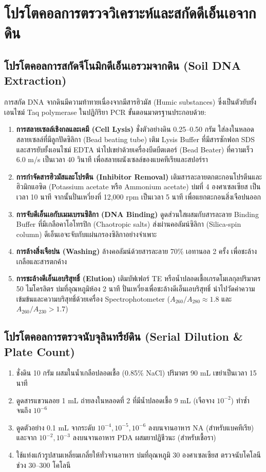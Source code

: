 \chapter{โปรโตคอลการตรวจวิเคราะห์และสกัดดีเอ็นเอจากดิน}
\label{app:protocols}

\section{โปรโตคอลการสกัดจีโนมิกดีเอ็นเอรวมจากดิน (Soil DNA Extraction)}
การสกัด DNA จากดินมีความท้าทายเนื่องจากมีสารฮิวมัส (Humic substances) ซึ่งเป็นตัวยับยั้งเอนไซม์ Taq polymerase ในปฏิกิริยา PCR ขั้นตอนมาตรฐานประกอบด้วย:
\begin{enumerate}
    \item \textbf{การสลายเซลล์เชิงกลและเคมี (Cell Lysis)} ชั่งตัวอย่างดิน 0.25--0.50 กรัม ใส่ลงในหลอดสลายเซลล์ที่มีลูกปัดซิลิกา (Bead beating tube) เติม Lysis Buffer ที่มีสารซักฟอก SDS และสารยับยั้งเอนไซม์ EDTA นำไปเขย่าด้วยเครื่องบีดบีตเตอร์ (Bead Beater) ที่ความเร็ว 6.0 m/s เป็นเวลา 40 วินาที เพื่อสลายผนังเซลล์ของแบคทีเรียและสปอร์รา
    \item \textbf{การกำจัดสารฮิวมัสและโปรตีน (Inhibitor Removal)} เติมสารละลายตกตะกอนโปรตีนและฮิวมิกแอซิด (Potassium acetate หรือ Ammonium acetate) บ่มที่ 4 องศาเซลเซียส เป็นเวลา 10 นาที จากนั้นปั่นเหวี่ยงที่ 12,000 rpm เป็นเวลา 5 นาที เพื่อแยกตะกอนสิ่งเจือปนออก
    \item \textbf{การจับดีเอ็นเอกับเมมเบรนซิลิกา (DNA Binding)} ดูดส่วนใสผสมกับสารละลาย Binding Buffer ที่มีเกลือคาโอโทรปิก (Chaotropic salts) ส่งผ่านคอลัมน์ซิลิกา (Silica-spin column) ดีเอ็นเอจะจับกับแผ่นกรองซิลิกาอย่างจำเพาะ
    \item \textbf{การล้างสิ่งเจือปน (Washing)} ล้างคอลัมน์ด้วยสารละลาย 70\% เอทานอล 2 ครั้ง เพื่อชะล้างเกลือและสารตกค้าง
    \item \textbf{การชะล้างดีเอ็นเอบริสุทธิ์ (Elution)} เติมบัฟเฟอร์ TE หรือน้ำปลอดเชื้อเกรดโมเลกุลปริมาตร 50 ไมโครลิตร บ่มที่อุณหภูมิห้อง 2 นาที ปั่นเหวี่ยงเพื่อชะล้างดีเอ็นเอบริสุทธิ์ นำไปวัดค่าความเข้มข้นและความบริสุทธิ์ด้วยเครื่อง Spectrophotometer ($A_{260}/A_{280} \approx 1.8$ และ $A_{260}/A_{230} > 1.7$)
\end{enumerate}

\section{โปรโตคอลการตรวจนับจุลินทรีย์ดิน (Serial Dilution \& Plate Count)}
\begin{enumerate}
    \item ชั่งดิน 10 กรัม ผสมในน้ำเกลือปลอดเชื้อ (0.85\% NaCl) ปริมาตร 90 mL เขย่าเป็นเวลา 15 นาที
    \item ดูดสารแขวนลอย 1 mL ถ่ายลงในหลอดที่ 2 ที่มีน้ำปลอดเชื้อ 9 mL (เจือจาง $10^{-2}$) ทำซ้ำจนถึง $10^{-6}$
    \item ดูดตัวอย่าง 0.1 mL จากระดับ $10^{-4}, 10^{-5}, 10^{-6}$ ลงบนจานอาหาร NA (สำหรับแบคทีเรีย) และจาก $10^{-2}, 10^{-3}$ ลงบนจานอาหาร PDA ผสมยาปฏิชีวนะ (สำหรับเชื้อรา)
    \item ใช้แท่งแก้วรูปสามเหลี่ยมเกลี่ยให้ทั่วจานอาหาร บ่มที่อุณหภูมิ 30 องศาเซลเซียส ตรวจนับโคโลนีช่วง 30--300 โคโลนี
\end{enumerate}

\clearpage